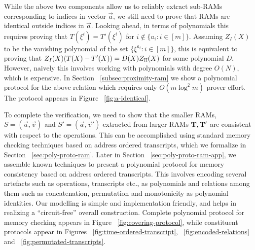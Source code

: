 \smallskip

 While the above two components allow us to reliably extract sub-RAMs
corresponding to indices in vector $\vec{a}$, we still need to prove that RAMs are identical outside indices in
$\vec{a}$. Looking ahead, in terms of polynomials this requires proving that $T(\xi^i)=T'(\xi^i)$ for $i\not\in
\{a_i:i\in [m]\}$. Assuming $Z_I(X)$ to be the vanishing polynomial of the set $\{\xi^{a_i}:i\in [m]\}$,
this is equivalent to proving that $Z_I(X)(T(X) - T'(X)) = D(X)Z_\mathbb{H}(X)$ for some polynomial $D$. However, naively
this involves working with polynomials with degree $O(N)$, which is expensive.
In Section ~\ref{subsec:proximity-ram} we show a polynomial protocol for the above relation which requires only $O(m\log^2 m)$ prover effort. The protocol
appears in Figure ~\ref{fig:a-identical}.

\smallskip

 To complete the verification, we need to show that
the smaller RAMs, $S=(\vec{a},\vec{v})$ and $S'=(\vec{a},\vec{v}')$ extracted from larger RAMs $\mathbf{T},\mathbf{T}'$
are consistent with respect to the operations. This can be accomplished using standard memory checking techniques
based on address ordered transcripts, which we formalize in Section ~\ref{sec:poly-proto-ram}. Later in
Section ~\ref{sec:poly-proto-ram-app}, we assemble known techniques to present a polynomial protocol
for memory consistency based on address ordered transcripts.
This involves encoding several artefacts such as operations, transcripts etc., as polynomials and relations
among them such as concatenation, permutation and monotonicity as polynomial identities. Our modelling is
simple and implementation friendly, and helps in realizing a ``circuit-free'' overall construction. Complete
polynomial protocol for memory checking appears in Figure ~\ref{fig:covering-protocol}, while constituent protocols
appear in Figures ~\ref{fig:time-ordered-transcript}, ~\ref{fig:encoded-relations} and ~\ref{fig:permutated-transcripts}.

\smallskip

